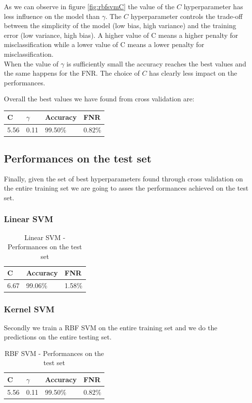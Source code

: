 \documentclass[twocolumn, switch]{article} %
\begin{document}
As we can observe in figure \ref{fig:rbfsvmC} the value of the $C$ hyperparameter has less influence on the model than $\gamma$. The $C$  hyperparameter controls the trade-off between the simplicity of the model (low bias, high variance) and the training error (low variance, high bias). A higher value of C means a higher penalty for misclassification while a lower value of C means a lower penalty for misclassification.\\
When the value of $\gamma$ is sufficiently small the accuracy reaches the best values and the same happens for the FNR. The choice of $C$ has clearly less impact on the performances.

Overall the best values we have found from cross validation are:

\begin{table}[ht!]
	\centering
	\begin{tabular}{|l|l|l|l|}
		\hline
		\textbf{C} & \textbf{$\gamma$} & \textbf{Accuracy} & \textbf{FNR} \\ \hline
		5.56       & 0.11              & 99.50\%           & 0.82\%       \\ \hline
	\end{tabular}
\end{table}

\subsection{Performances on the test set}
Finally, given the set of best hyperparameters found through cross validation on the entire training set we are going to asses the performances achieved on the test set.
\subsubsection{Linear SVM}

\begin{table}[ht!]
	\centering
	\begin{tabular}{|l|l|l|}
		\hline
		\textbf{C} & \textbf{Accuracy} & \textbf{FNR} \\ \hline
		6.67       & 99.06\%           & 1.58\%       \\ \hline
	\end{tabular}
	\caption{Linear SVM - Performances on the test set}
\end{table}

\subsubsection{Kernel SVM}
Secondly we train a RBF SVM on the entire training set and we do the predictions on the entire testing set.
\begin{table}[ht!]
	\centering
	\begin{tabular}{|l|l|l|l|}
		\hline
		\textbf{C} & \textbf{$\gamma$} & \textbf{Accuracy} & \textbf{FNR} \\ \hline
		5.56       & 0.11              & 99.50\%           & 0.82\%       \\ \hline
	\end{tabular}
	\caption{RBF SVM - Performances on the test set}
\end{table}
\end{document}
